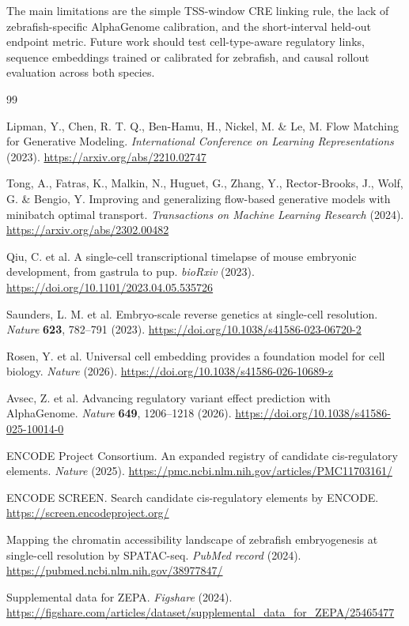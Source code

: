 \documentclass[11pt]{article}
\newcommand{\ag}{AlphaGenome}
\begin{document}
The main limitations are the simple TSS-window CRE linking rule, the lack of
zebrafish-specific \ag{} calibration, and the short-interval held-out endpoint
metric. Future work should test cell-type-aware regulatory links, sequence
embeddings trained or calibrated for zebrafish, and causal rollout evaluation
across both species.

\begin{thebibliography}{99}

Lipman, Y., Chen, R. T. Q., Ben-Hamu, H., Nickel, M. \& Le, M.
Flow Matching for Generative Modeling.
\textit{International Conference on Learning Representations} (2023).
\url{https://arxiv.org/abs/2210.02747}

Tong, A., Fatras, K., Malkin, N., Huguet, G., Zhang, Y.,
Rector-Brooks, J., Wolf, G. \& Bengio, Y.
Improving and generalizing flow-based generative models with minibatch optimal transport.
\textit{Transactions on Machine Learning Research} (2024).
\url{https://arxiv.org/abs/2302.00482}

Qiu, C. et al.
A single-cell transcriptional timelapse of mouse embryonic development, from gastrula to pup.
\textit{bioRxiv} (2023).
\url{https://doi.org/10.1101/2023.04.05.535726}

Saunders, L. M. et al.
Embryo-scale reverse genetics at single-cell resolution.
\textit{Nature} \textbf{623}, 782--791 (2023).
\url{https://doi.org/10.1038/s41586-023-06720-2}

Rosen, Y. et al.
Universal cell embedding provides a foundation model for cell biology.
\textit{Nature} (2026).
\url{https://doi.org/10.1038/s41586-026-10689-z}

Avsec, Z. et al.
Advancing regulatory variant effect prediction with AlphaGenome.
\textit{Nature} \textbf{649}, 1206--1218 (2026).
\url{https://doi.org/10.1038/s41586-025-10014-0}

ENCODE Project Consortium.
An expanded registry of candidate cis-regulatory elements.
\textit{Nature} (2025).
\url{https://pmc.ncbi.nlm.nih.gov/articles/PMC11703161/}

ENCODE SCREEN.
Search candidate cis-regulatory elements by ENCODE.
\url{https://screen.encodeproject.org/}

Mapping the chromatin accessibility landscape of zebrafish embryogenesis at single-cell resolution by SPATAC-seq.
\textit{PubMed record} (2024).
\url{https://pubmed.ncbi.nlm.nih.gov/38977847/}

Supplemental data for ZEPA.
\textit{Figshare} (2024).
\url{https://figshare.com/articles/dataset/supplemental_data_for_ZEPA/25465477}

\end{thebibliography}
\end{document}
